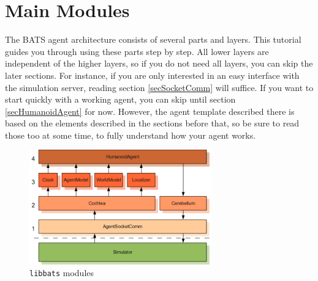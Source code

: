 \chapter{Main Modules}
\label{chTutorial}

The BATS agent architecture consists of several parts and layers. This
tutorial guides you through using these parts step by step. All lower
layers are independent of the higher layers, so if you do not need all
layers, you can skip the later sections. For instance, if you are only
interested in an easy interface with the simulation server, reading
section \ref{secSocketComm} will suffice. If you want to start quickly
with a working agent, you can skip until section
\ref{secHumanoidAgent} for now. However, the agent template described
there is based on the elements described in the sections before that,
so be sure to read those too at some time, to fully understand how
your agent works.

\begin{figure}
	\centering
	\includegraphics[width=0.7\textwidth]{libbats.png}
	\caption{{\tt libbats} modules}
	\label{fig:libbats}
\end{figure}


